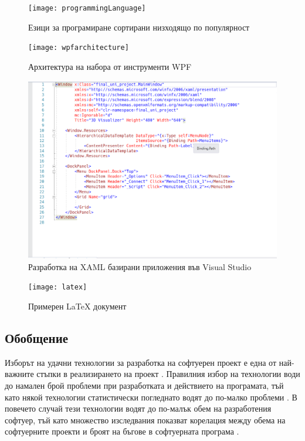 \begin{figure}
    \centering
    \centerline{\texttt{[image: programmingLanguage]}}
    \caption{Езици за програмиране сортирани низходящо по популярност}
    \label{fig:prog}
\end{figure}


\begin{figure}
    \centering
    \centerline{\texttt{[image: wpfarchitecture]}}
    \caption{Архитектура на набора от инструменти WPF}
    \label{fig:wpf}
\end{figure}

\begin{figure}
    \centering
    \centerline{\includegraphics{xaml}}
    \caption{Разработка на XAML базирани приложения във Visual Studio}
    \label{vsXaml}
\end{figure}

\begin{figure}
    \centering
    \centerline{\texttt{[image: latex]}}
    \caption{Примерен LaTeX документ}
    \label{latex}
\end{figure}

\subsection{Обобщение}
Изборът на удачни технологии за разработка на софтуерен проект е една от най-важните стъпки в реализирането на проект \cite{technologiesImportance}. Правилния избор на технологии води до намален брой проблеми при разработката и действието на програмата, тъй като някой технологии статистически погледнато водят до по-малко проблеми \cite{langResearch}. В повечето случай тези технологии водят до по-малък обем на разработения софтуер, тъй като множество изследвания показват корелация между обема на софтуерните проекти и броят на бъгове в софтуерната програма \cite{bugsToLength}.